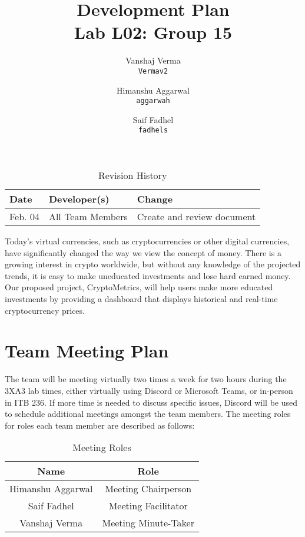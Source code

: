 \documentclass[12pt,fleqn]{article}
\title{\vspace*{150pt}Development Plan\\\vspace{10pt}Lab L02: Group 15}
\author{
Vanshaj Verma\\
    \texttt{Vermav2}	
	\\
\and 
Himanshu Aggarwal\\
	\texttt{aggarwah}
	\\
\and
Saif Fadhel\\
  	\texttt{fadhels}
  	\\
}
\date{\submissionDate{}}
\begin{document}
\vspace*{\fill}
\begin{table}[hp]
\centering
\caption{Revision History} \label{TblRevisionHistory}
\begin{tabularx}{\textwidth}{llX}
\toprule
\textbf{Date} & \textbf{Developer(s)} & \textbf{Change}\\
\midrule
Feb. 04 & All Team Members & Create and review document\\
\bottomrule
\end{tabularx}
\end{table}
\vspace*{\fill}


\newpage

\maketitle
\thispagestyle{empty}
\pagebreak

\noindent Today's virtual currencies, such as cryptocurrencies or other digital currencies, have significantly changed the way we view the concept of money. There is a growing interest in crypto worldwide, but without any knowledge of the projected trends, it is easy to make uneducated investments and lose hard earned money. Our proposed project, CryptoMetrics, will help users make more educated investments by providing a dashboard that displays historical and real-time cryptocurrency prices.

\section{Team Meeting Plan}
\noindent The team will be meeting virtually two times a week for two hours during the 3XA3 lab times, either virtually using Discord or Microsoft Teams, or in-person in ITB 236. If more time is needed to discuss specific issues, Discord will be used to schedule additional meetings amongst the team members. The meeting roles for roles each team member are described as follows: \\

\begin{table}[h!]
    \centering
    \begin{tabular}{|c|c|}
    \hline
    \multicolumn{1}{|c|}{Name}              & \multicolumn{1}{c|}{Role}                \\ \hline
    \multicolumn{1}{|c|}{Himanshu Aggarwal} & \multicolumn{1}{c|}{Meeting Chairperson} \\ \hline
    Saif Fadhel                             & Meeting Facilitator                      \\ \hline
    Vanshaj Verma                           & Meeting Minute-Taker                     \\ \hline
    \end{tabular}
    \caption{Meeting Roles}
\end{table}
\end{document}
